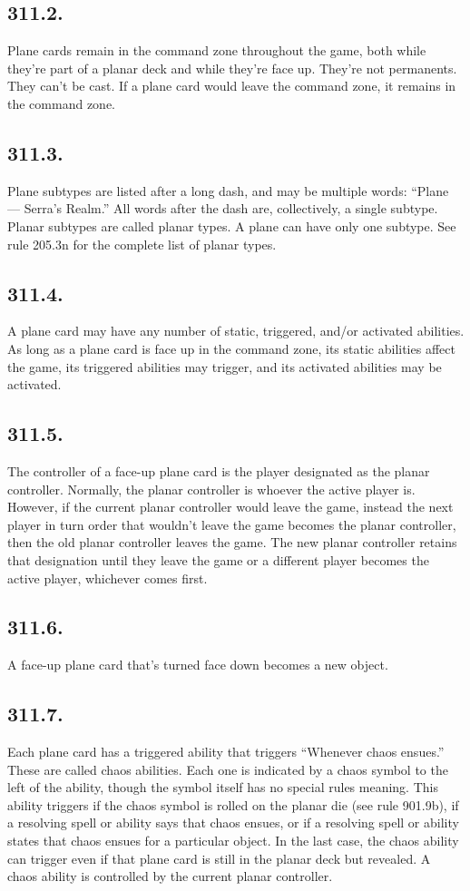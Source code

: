 \subsection*{311.2.}
Plane cards remain in the command zone throughout the game, both while they’re part of a planar deck and while they’re face up. They’re not permanents. They can’t be cast. If a plane card would leave the command zone, it remains in the command zone.

\subsection*{311.3.}
Plane subtypes are listed after a long dash, and may be multiple words: “Plane — Serra’s Realm.” All words after the dash are, collectively, a single subtype. Planar subtypes are called planar types. A plane can have only one subtype. See rule 205.3n for the complete list of planar types.

\subsection*{311.4.}
A plane card may have any number of static, triggered, and/or activated abilities. As long as a plane card is face up in the command zone, its static abilities affect the game, its triggered abilities may trigger, and its activated abilities may be activated.

\subsection*{311.5.}
The controller of a face-up plane card is the player designated as the planar controller. Normally, the planar controller is whoever the active player is. However, if the current planar controller would leave the game, instead the next player in turn order that wouldn’t leave the game becomes the planar controller, then the old planar controller leaves the game. The new planar controller retains that designation until they leave the game or a different player becomes the active player, whichever comes first.

\subsection*{311.6.}
A face-up plane card that’s turned face down becomes a new object.

\subsection*{311.7.}
Each plane card has a triggered ability that triggers “Whenever chaos ensues.” These are called chaos abilities. Each one is indicated by a chaos symbol to the left of the ability, though the symbol itself has no special rules meaning. This ability triggers if the chaos symbol is rolled on the planar die (see rule 901.9b), if a resolving spell or ability says that chaos ensues, or if a resolving spell or ability states that chaos ensues for a particular object. In the last case, the chaos ability can trigger even if that plane card is still in the planar deck but revealed. A chaos ability is controlled by the current planar controller.


